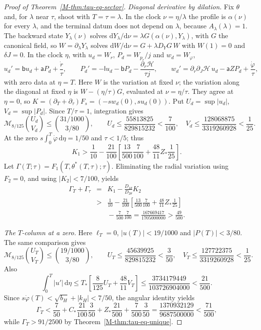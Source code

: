 \documentclass[aip,jmp,amsmath,amssymb,reprint]{revtex4-2}
\newcommand{\dd}{\mathrm{d}}
\theoremstyle{plain}
\theoremstyle{definition}
\begin{document}
\begin{proof}[Proof of Theorem~\ref{M-thm:tau-eq-sector}]
\emph{Diagonal derivative by dilation.} Fix $\theta$ and, for $\lambda$ near $\tau$, shoot with $T=\tau=\lambda$. In the
clock $\nu=\eta/\lambda$ the profile is $\alpha(\nu)$ for every $\lambda$, and the terminal datum does not depend on $\lambda$,
because $A_\lambda(\lambda)=1$. The backward state $Y_\lambda(\nu)$ solves $\dd Y_\lambda/\dd \nu=\lambda G(\alpha(\nu),Y_\lambda)$, with $G$
the canonical field, so $W=\partial_\lambda Y_\lambda$ solves $\dd W/\dd \nu=G+\lambda D_YG\,W$ with $W(1)=0$ and $\delta J=0$. In the
clock $\eta$, with $u_d=W_r$, $P_d=W_{p_r}/j$ and $w_d=W_\varphi$,
\[
  u_d'=\mathsf bu_d+\mathsf aP_d+\frac{\dot r}\tau,\qquad
  P_d'=-\mathsf lu_d-\mathsf bP_d-\frac{\partial_r\mathcal H}{\tau j},\qquad
  w_d'=\partial_r\partial_J\mathcal H\,u_d-\mathsf aZP_d+\frac{\dot\varphi}\tau ,
\]
with zero data at $\eta=T$. Here $W$ is the variation at fixed $\nu$;
the variation along the diagonal at fixed $\eta$ is
$W-(\eta/\tau)G$, evaluated at $\nu=\eta/\tau$.
They agree at $\eta=0$, so
$K=(\partial_T+\partial_\tau)F_s=(-sw_d(0),su_d(0))$.
Put $U_d=\sup|u_d|$, $V_d=\sup|P_d|$. Since $T/\tau=1$, integration gives
\[
 \mathcal M_{8/125}\binom{U_d}{V_d}\le\binom{31/1000}{3/80},\qquad
 U_d\le\frac{55813825}{829815232}<\frac7{100},\quad
 V_d\le\frac{128068875}{3319260928}<\frac1{25}.
\]
At the zero $s\int_0^T\dot\varphi\,\dd\eta=1/50$ and $\tau<1/5$; thus
\[
 K_1>\frac1{10}-\frac{21}{100}
       \left[\frac{13}{500}\frac7{100}+\frac{48}{11}Z_*\frac1{25}\right].
\]
Let $\Gamma(T;\tau)=F_1(T,\theta^*(T,\tau);\tau)$.
Eliminating the radial variation using $F_2=0$, and using $|K_2|<7/100$, yields
\begin{eqnarray*}
 \Gamma_T+\Gamma_\tau
 &=&K_1-\frac{D_{1\theta}}{D_{2\theta}}K_2\\
 &>&\frac1{10}-\frac{21}{100}
       \left[\frac{13}{500}\frac7{100}+\frac{48}{11}Z_*\frac1{25}\right]\\
 &&{}-\frac7{500}\frac7{100}
 =\frac{167669417}{1705000000}>\frac{49}{500}.
\end{eqnarray*}

\emph{The $T$-column at a zero.} Here $\ell_T=0$,
$|u(T)|<19/1000$ and $|P(T)|<3/80$. The same comparison gives
\[
 \mathcal M_{8/125}\binom{U_T}{V_T}\le\binom{19/1000}{3/80},\qquad
 U_T\le\frac{45639925}{829815232}<\frac3{50},\quad
 V_T\le\frac{127722375}{3319260928}<\frac1{25}.
\]
Also
\[
 \int_0^T|u'|\,\dd\eta
 \le T_*\left[\frac8{125}U_T+\frac{48}{11}V_T\right]
 \le\frac{3734179449}{103726904000}<\frac{21}{500}.
\]
Since $s\dot\varphi(T)<\sqrt{b_H}+|k_H|<7/50$, the angular identity yields
\[
 \Gamma_T<\frac7{50}+C_*\frac{21}{100}\frac3{50}
       +Z_*\frac{21}{500}+\frac7{500}\frac3{50}
 =\frac{1370932129}{9687500000}<\frac{71}{500},
\]
while $\Gamma_T>91/2500$ by Theorem~\ref{M-thm:tau-eq-unique}.


\end{proof}
\end{document}
